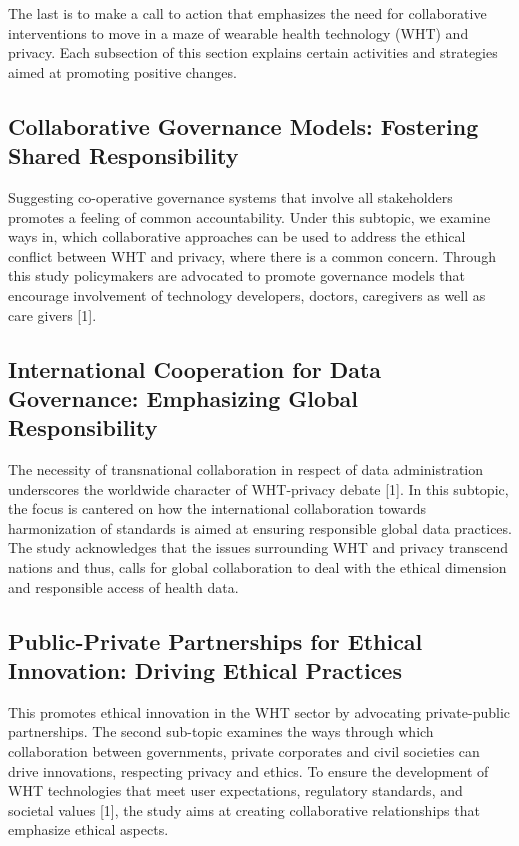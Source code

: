 \documentclass[11pt]{article}
\begin{document}
The last is to make a call to action that emphasizes the need for collaborative interventions to move in a maze of wearable health technology (WHT) and privacy. Each subsection of this section explains certain activities and strategies aimed at promoting positive changes.

\subsection{Collaborative Governance Models: Fostering Shared Responsibility}

Suggesting co-operative governance systems that involve all stakeholders promotes a feeling of common accountability. Under this subtopic, we examine ways in, which collaborative approaches can be used to address the ethical conflict between WHT and privacy, where there is a common concern. Through this study policymakers are advocated to promote governance models that encourage involvement of technology developers, doctors, caregivers as well as care givers [1].

\subsection{International Cooperation for Data Governance: Emphasizing Global Responsibility}

The necessity of transnational collaboration in respect of data administration underscores the worldwide character of WHT-privacy debate [1]. In this subtopic, the focus is cantered on how the international collaboration towards harmonization of standards is aimed at ensuring responsible global data practices. The study acknowledges that the issues surrounding WHT and privacy transcend nations and thus, calls for global collaboration to deal with the ethical dimension and responsible access of health data.

\subsection{Public-Private Partnerships for Ethical Innovation: Driving Ethical Practices}

This promotes ethical innovation in the WHT sector by advocating private-public partnerships. The second sub-topic examines the ways through which collaboration between governments, private corporates and civil societies can drive innovations, respecting privacy and ethics. To ensure the development of WHT technologies that meet user expectations, regulatory standards, and societal values [1], the study aims at creating collaborative relationships that emphasize ethical aspects.
\end{document}
